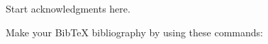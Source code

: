 \documentclass{ametsoc}
\begin{document}
{%

%
\acknowledgments
Start acknowledgments here.

%






%
%
%
Make your BibTeX bibliography by using these commands:




}
\end{document}
